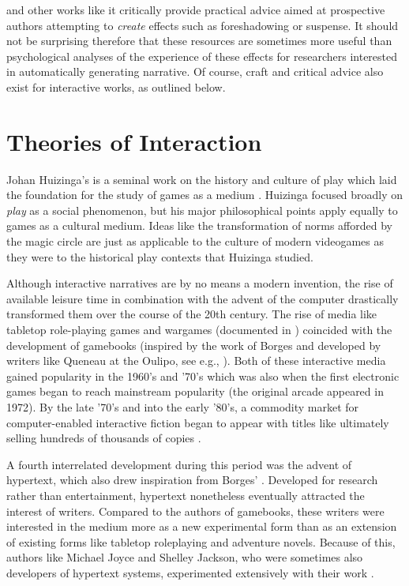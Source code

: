  and other works like it critically provide practical advice aimed at prospective authors attempting to \emph{create} effects such as foreshadowing or suspense.
%
It should not be surprising therefore that these resources are sometimes more useful than psychological analyses of the experience of these effects for researchers interested in automatically generating narrative.
%
Of course, craft and critical advice also exist for interactive works, as outlined below.


\section{Theories of Interaction}

Johan Huizinga's  is a seminal work on the history and culture of play which laid the foundation for the study of games as a medium \citep{Huizinga1949}.
%
Huizinga focused broadly on \emph{play} as a social phenomenon, but his major philosophical points apply equally to games as a cultural medium.
%
Ideas like the transformation of norms afforded by the magic circle are just as applicable to the culture of modern videogames as they were to the historical play contexts that Huizinga studied.


Although interactive narratives are by no means a modern invention, the rise of available leisure time in combination with the advent of the computer drastically transformed them over the course of the 20th century.
%
The rise of media like tabletop role-playing games and wargames (documented in \citep{Peterson2012}) coincided with the development of gamebooks (inspired by the work of Borges \citep{Borges1956} and developed by writers like Queneau at the Oulipo, see e.g., \citep{Queneau1967}).
%
Both of these interactive media gained popularity in the 1960's and '70's which was also when the first electronic games began to reach mainstream popularity (the original arcade  appeared in 1972).
%
By the late '70's and into the early '80's, a commodity market for computer-enabled interactive fiction began to appear with titles like  ultimately selling hundreds of thousands of copies \citep{Zork}.


A fourth interrelated development during this period was the advent of hypertext, which also drew inspiration from Borges' .
%
Developed for research rather than entertainment, hypertext nonetheless eventually attracted the interest of writers.
%
Compared to the authors of gamebooks, these writers were interested in the medium more as a new experimental form than as an extension of existing forms like tabletop roleplaying and adventure novels.
%
Because of this, authors like Michael Joyce and Shelley Jackson, who were sometimes also developers of hypertext systems, experimented extensively with their work \citep{Joyce1990, Jackson1995}.


